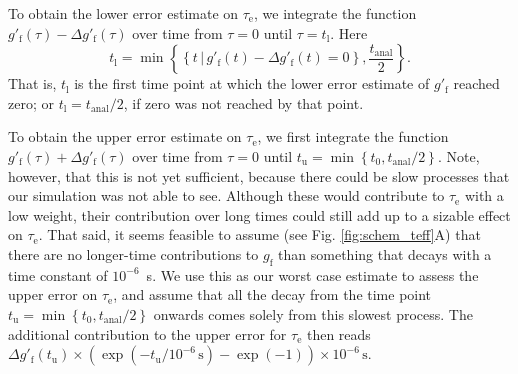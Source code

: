 \documentclass[journal=jpcbfk,manuscript=article,layout=twocolumn]{achemso}
\begin{document}
To obtain the lower error estimate on $\tau_\mathrm e$, we integrate the function
$g'_{\mathrm{f}}(\tau) - \Delta g'_{\mathrm{f}}(\tau)$ over time from $\tau=0$ until $\tau=t_\mathrm l$.
Here
\begin{equation}
t_\mathrm l= \min
\left\{
	\left\{
		t\,|\,g'_{\mathrm{f}}(t) - \Delta g'_{\mathrm{f}}(t) = 0
	\right\},
	\frac{t_\mathrm{anal}}{2}
\right\}.
\end{equation}
That is,
$t_\mathrm l$ is
the first time point at which the lower error estimate of $g'_\mathrm f$ reached zero;
or $t_\mathrm l=t_\mathrm{anal}/2$, if zero was not reached by that point.

To obtain the upper error estimate on $\tau_\mathrm e$, we first integrate the function
$g'_{\mathrm{f}}(\tau) + \Delta g'_{\mathrm{f}}(\tau)$ over time from $\tau=0$ until
$
t_\mathrm u= \min
\left\{
	t_0,
	{t_\mathrm{anal}}/{2}
\right\}.
$
Note, however,
that this is not yet sufficient, because there could be slow processes that our simulation was not
able to see. Although these would contribute to $\tau_\mathrm e$ with a low weight,
their contribution over long times could still add up to a sizable effect on $\tau_\mathrm e$.
%
That said, it seems feasible to assume (see Fig. \ref{fig:schem_teff}A) that there are no longer-time contributions
to $g_\mathrm f$ than something that decays with a time constant of $10^{-6}$~s.
%
We use this as our worst case estimate to assess the upper error on $\tau_\mathrm e$, and
%
assume that all the decay from the time point
$
t_\mathrm u= \min
\left\{
	t_0,
	{t_\mathrm{anal}}/{2}
\right\}
$
onwards comes solely from this slowest process.
%
The additional contribution to the upper error for $\tau_\mathrm e$ then reads
$
\Delta g'_\mathrm f(t_\mathrm u) \times \left(\exp(-t_\mathrm u / 10^{-6}\,\mathrm s) - \exp(-1)\right) \times 10^{-6}\,\mathrm s.
$

\end{document}
